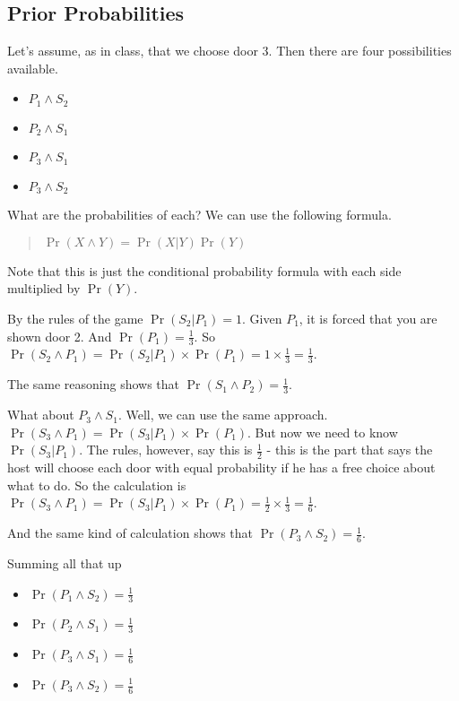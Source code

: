 \documentclass[11pt,]{article}
\providecommand{\tightlist}{%
  \setlength{\itemsep}{0pt}\setlength{\parskip}{0pt}}
\begin{document}
\hypertarget{prior-probabilities}{%
\subsection{Prior Probabilities}\label{prior-probabilities}}

Let's assume, as in class, that we choose door 3. Then there are four
possibilities available.

\begin{itemize}
\tightlist
\item
  \(P_1 \wedge S_2\)
\item
  \(P_2 \wedge S_1\)
\item
  \(P_3 \wedge S_1\)
\item
  \(P_3 \wedge S_2\)
\end{itemize}

What are the probabilities of each? We can use the following formula.

\begin{quote}
\(\Pr(X \wedge Y) = \Pr(X | Y)\Pr(Y)\)
\end{quote}

Note that this is just the conditional probability formula with each
side multiplied by \(\Pr(Y)\).

By the rules of the game \(\Pr(S_2 | P_1) = 1\). Given \(P_1\), it is
forced that you are shown door 2. And \(\Pr(P_1) = \frac{1}{3}\). So
\(\Pr(S_2 \wedge P_1) = \Pr(S_2 | P_1) \times \Pr(P_1) = 1 \times \frac{1}{3} = \frac{1}{3}\).

The same reasoning shows that \(\Pr(S_1 \wedge P_2) = \frac{1}{3}\).

What about \(P_3 \wedge S_1\). Well, we can use the same approach.
\(\Pr(S_3 \wedge P_1) = \Pr(S_3 | P_1) \times \Pr(P_1)\). But now we
need to know \(\Pr(S_3 | P_1)\). The rules, however, say this is
\(\frac{1}{2}\) - this is the part that says the host will choose each
door with equal probability if he has a free choice about what to do. So
the calculation is
\(\Pr(S_3 \wedge P_1) = \Pr(S_3 | P_1) \times \Pr(P_1) = \frac{1}{2} \times \frac{1}{3} = \frac{1}{6}\).

And the same kind of calculation shows that
\(\Pr(P_3 \wedge S_2) = \frac{1}{6}\).

Summing all that up

\begin{itemize}
\tightlist
\item
  \(\Pr(P_1 \wedge S_2) = \frac{1}{3}\)
\item
  \(\Pr(P_2 \wedge S_1) = \frac{1}{3}\)
\item
  \(\Pr(P_3 \wedge S_1) = \frac{1}{6}\)
\item
  \(\Pr(P_3 \wedge S_2) = \frac{1}{6}\)
\end{itemize}
\end{document}
